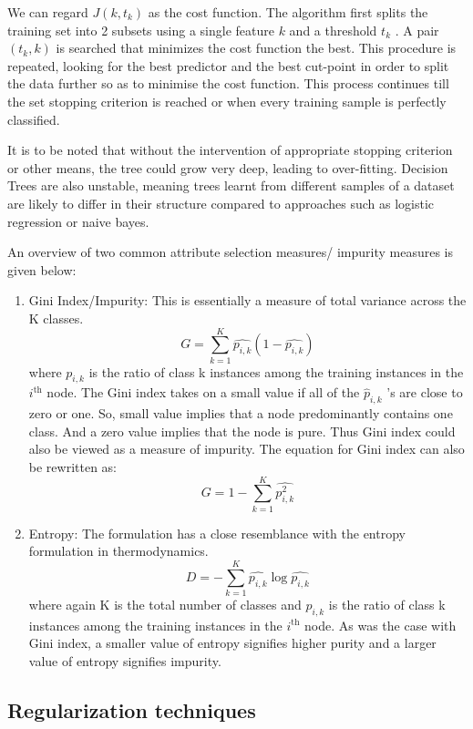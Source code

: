 \documentclass[conference]{IEEEtran}
\begin{document}
We can regard $J(k, t_k)$ as the cost function. The algorithm first splits the training set into 2 subsets using a single feature $k$ and a threshold $t_k$ . A pair $(t_k , k)$ is searched that minimizes the cost function the best. This procedure is repeated, looking for the best predictor and the best cut-point in order to split the data further so as to minimise the cost function. This process
continues till the set stopping criterion is reached or when every training sample is perfectly classified.

It is to be noted that without the intervention of appropriate stopping criterion or other means, the tree could grow very deep, leading to over-fitting. Decision Trees are also unstable, meaning trees learnt from different samples of a dataset are likely to differ in their structure compared to approaches such as logistic regression or naive bayes.

An overview of two common attribute selection measures/ impurity measures is given below:

\begin{enumerate}

    \item Gini Index/Impurity: This is essentially a measure of total variance across the K classes.
    $$ G = \sum_{k=1}^{K}\hat{p_{i, k}}(1 - \hat{p_{i, k}}) $$ where $p_{i,k}$ is the ratio of class k instances among the training instances in the ${i^\textrm{th}}$ node. The Gini index takes on a small value if all of the $\hat{p}_{i,k}$ ’s are close to zero or one. So, small value implies that a node predominantly contains one class. And a zero value implies that the node is pure. Thus Gini index could also be viewed as a measure of impurity. The equation for Gini index can also be rewritten as:
    $$ G = 1 - \sum_{k=1}^{K}\hat{p_{i, k}^2} $$
    
    \item Entropy: The formulation has a close resemblance with the entropy formulation in thermodynamics. 
    $$ D = -\sum_{k = 1}^{K}\hat{p_{i, k}}\log{\hat{p_{i, k}}} $$ where again K is the total number of classes and $p_{i,k}$ is the ratio of class k instances among the training instances in the ${i^\textrm{th}}$ node. As was the case with Gini index, a smaller value of entropy signifies higher purity and a larger value of entropy signifies impurity.
\end{enumerate}



\subsection{Regularization techniques}
\end{document}
